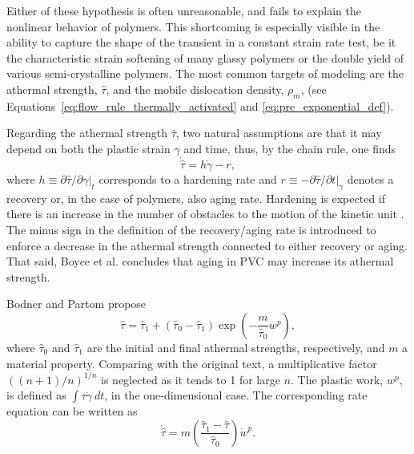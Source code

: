 Either of these hypothesis is often unreasonable, and fails to explain the nonlinear behavior of polymers.
This shortcoming is especially visible in the ability to capture the shape of the transient in a constant strain rate test, be it the characteristic strain softening of many glassy polymers or the double yield of various semi-crystalline polymers.
The most common targets of modeling are the athermal strength, $\hat \tau$, and the mobile dislocation density, $\rho_m$, (see Equations~\eqref{eq:flow_rule_thermally_activated} and \eqref{eq:pre_exponential_def}).

Regarding the athermal strength $\hat \tau$, two natural assumptions are that it may depend on both the plastic strain $\gamma$ and time, thus, by the chain rule, one finds
\begin{equation}
  \dot{\hat \tau} = h \dot\gamma - r,
\end{equation}
where $h\equiv \partial \hat \tau/\partial \gamma |_t$ corresponds to a hardening rate and $r\equiv - \partial \hat \tau/\partial t|_\gamma$ denotes a recovery or, in the case of polymers, also aging rate.
Hardening is expected if there is an increase in the number of obstacles to the motion of the kinetic unit \citep{kocks1975thermodynamics, hasanConstitutiveModelNonlinear1995}.
The minus sign in the definition of the recovery/aging rate is introduced to enforce a decrease in the athermal strength connected to either recovery or aging.
That said, Boyce et al. \citep{boyceLargeInelasticDeformation1988} concludes that aging in PVC may increase its athermal strength.

Bodner and Partom \citep{bodnerConstitutiveEquationsElasticViscoplastic1975} propose
\begin{equation}
  \hat \tau = {\hat \tau}_1 + ({\hat \tau}_0 - {\hat \tau}_1)\exp\left(-\frac{m}{{\hat \tau}_0}w^p\right),
\end{equation}
where ${\hat \tau}_0$ and ${\hat \tau}_1$ are the initial and final athermal strengths, respectively, and $m$ a material property.
Comparing with the original text, a multiplicative factor $((n+1)/n)^{1/n}$ is neglected as it tends to 1 for large $n$.
The plastic work, $w^p$, is defined as $\int \tau\dot \gamma\ dt$, in the one-dimensional case.
The corresponding rate equation can be written as \citep{zairiElastoviscoplasticConstitutiveEquations2007}
\begin{equation}
  \label{eq:bodner_partom_rate_eq}
  \dot{\hat \tau} = m\left(\frac{{\hat \tau}_1 - {\hat \tau}}{{\hat \tau}_0}\right)\dot w^p.
\end{equation}

